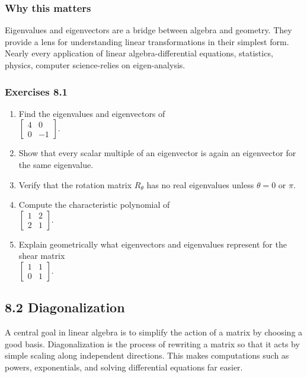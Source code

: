 \documentclass[
  12pt,
  a4paper,
]{article}
\begin{document}
\subsubsection{Why this matters}\label{why-this-matters-28}

Eigenvalues and eigenvectors are a bridge between algebra and geometry.
They provide a lens for understanding linear transformations in their
simplest form. Nearly every application of linear algebra-differential
equations, statistics, physics, computer science-relies on
eigen-analysis.

\subsubsection{Exercises 8.1}\label{exercises-81}

\begin{enumerate}
\def\labelenumi{\arabic{enumi}.}
\item
  Find the eigenvalues and eigenvectors of\\
  \(\begin{bmatrix} 4 & 0 \\ 0 & -1 \end{bmatrix}\).
\item
  Show that every scalar multiple of an eigenvector is again an
  eigenvector for the same eigenvalue.
\item
  Verify that the rotation matrix \(R_\theta\) has no real eigenvalues
  unless \(\theta = 0\) or \(\pi\).
\item
  Compute the characteristic polynomial of\\
  \(\begin{bmatrix} 1 & 2 \\ 2 & 1 \end{bmatrix}\).
\item
  Explain geometrically what eigenvectors and eigenvalues represent for
  the shear matrix\\
  \(\begin{bmatrix} 1 & 1 \\ 0 & 1 \end{bmatrix}\).
\end{enumerate}

\subsection{8.2 Diagonalization}\label{82-diagonalization}

A central goal in linear algebra is to simplify the action of a matrix
by choosing a good basis. Diagonalization is the process of rewriting a
matrix so that it acts by simple scaling along independent directions.
This makes computations such as powers, exponentials, and solving
differential equations far easier.
\end{document}
